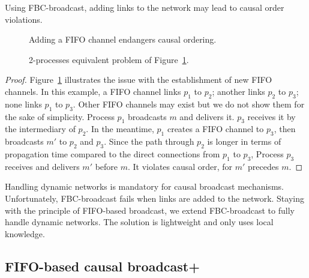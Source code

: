 \begin{theorem}
  Using FBC-broadcast, adding links to the network may lead to causal order
  violations.
\end{theorem}

\begin{figure}
  \begin{center}
    
    \caption{\label{fig:problem}Adding a FIFO channel endangers causal
      ordering.}
  \end{center}
\end{figure}

\begin{figure}
  \begin{center}
    
    \caption{\label{fig:eq2problem}2-processes equivalent problem of
      Figure~\ref{fig:problem}.}
  \end{center}
\end{figure}

\begin{proof}
  Figure~\ref{fig:problem} illustrates the issue with the establishment of new
  FIFO channels. In this example, a FIFO channel links $p_1$ to $p_2$; another
  links $p_2$ to $p_3$; none links $p_1$ to $p_3$. Other FIFO channels may exist
  but we do not show them for the sake of simplicity. Process $p_1$ broadcasts
  $m$ and delivers it. $p_3$ receives it by the intermediary of $p_2$. In the
  meantime, $p_1$ creates a FIFO channel to $p_3$, then broadcasts $m'$ to $p_2$
  and $p_3$. Since the path through $p_2$ is longer in terms of propagation time
  compared to the direct connections from $p_1$ to $p_3$, Process $p_3$ receives
  and delivers $m'$ before $m$. It violates causal order, for $m'$ precedes $m$.
\end{proof}

Handling dynamic networks is mandatory for causal broadcast
mechanisms. Unfortunately, FBC-broadcast fails when links are added to the
network. Staying with the principle of FIFO-based broadcast, we extend
FBC-broadcast to fully handle dynamic networks. The solution is lightweight and
only uses local knowledge.

\subsection{FIFO-based causal broadcast+}
\label{subsec:bufferbroadcast}

